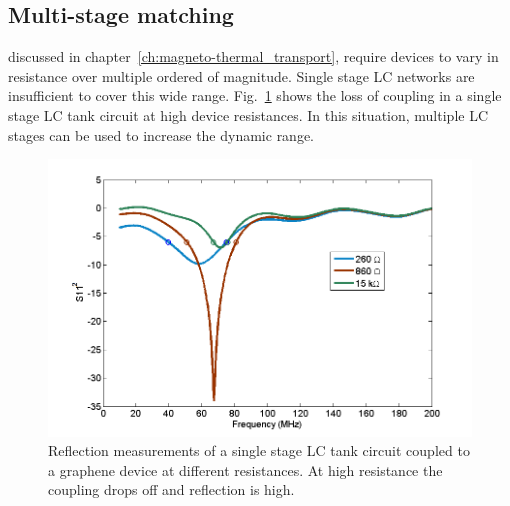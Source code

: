 \subsection{Multi-stage matching}
 discussed in chapter~\ref{ch:magneto-thermal_transport}, require devices to vary in resistance over multiple ordered of magnitude. Single stage LC networks are insufficient to cover this wide range. Fig.~\ref{fig:S11_3Rs} shows the loss of coupling in a single stage LC tank circuit at high device resistances. In this situation, multiple LC stages can be used to increase the dynamic range.
\begin{figure}
\centering
\includegraphics[width = 120mm]{figures/Johnson_noise_thermometry/S11_3Rs.png}
\caption{Reflection measurements of a single stage LC tank circuit coupled to a graphene device at different resistances. At high resistance the coupling drops off and reflection is high.}
\label{fig:S11_3Rs}
\end{figure}

